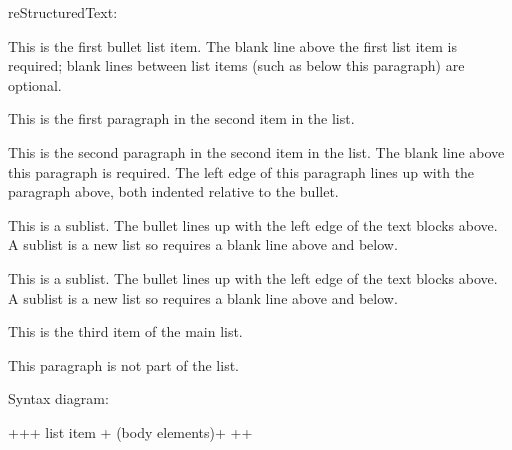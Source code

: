 \documentclass[letterpaper,12pt,english]{sphinxmanual}
\begin{document}
reStructuredText:

\begin{sphinxVerbatim}[commandchars=\\\{\}]
 This is the first bullet list item.  The blank line above the
  first list item is required; blank lines between list items
  (such as below this paragraph) are optional.

 This is the first paragraph in the second item in the list.

  This is the second paragraph in the second item in the list.
  The blank line above this paragraph is required.  The left edge
  of this paragraph lines up with the paragraph above, both
  indented relative to the bullet.

   This is a sublist.  The bullet lines up with the left edge of
    the text blocks above.  A sublist is a new list so requires a
    blank line above and below.

   This is a sublist.  The bullet lines up with the left edge of
the text blocks above.  A sublist is a new list so requires a
blank line above and below.

 This is the third item of the main list.

This paragraph is not part of the list.
\end{sphinxVerbatim}

Syntax diagram:

\begin{sphinxVerbatim}[commandchars=\\\{\}]
+\PYGZhy{}\PYGZhy{}\PYGZhy{}\PYGZhy{}\PYGZhy{}\PYGZhy{}+\PYGZhy{}\PYGZhy{}\PYGZhy{}\PYGZhy{}\PYGZhy{}\PYGZhy{}\PYGZhy{}\PYGZhy{}\PYGZhy{}\PYGZhy{}\PYGZhy{}\PYGZhy{}\PYGZhy{}\PYGZhy{}\PYGZhy{}\PYGZhy{}\PYGZhy{}\PYGZhy{}\PYGZhy{}\PYGZhy{}\PYGZhy{}\PYGZhy{}\PYGZhy{}+
 \PYGZdq{}\PYGZhy{} \PYGZdq{} \textbar{} list item             \textbar{}
+\PYGZhy{}\PYGZhy{}\PYGZhy{}\PYGZhy{}\PYGZhy{}\PYGZhy{}\textbar{} (body elements)+      \textbar{}
       +\PYGZhy{}\PYGZhy{}\PYGZhy{}\PYGZhy{}\PYGZhy{}\PYGZhy{}\PYGZhy{}\PYGZhy{}\PYGZhy{}\PYGZhy{}\PYGZhy{}\PYGZhy{}\PYGZhy{}\PYGZhy{}\PYGZhy{}\PYGZhy{}\PYGZhy{}\PYGZhy{}\PYGZhy{}\PYGZhy{}\PYGZhy{}\PYGZhy{}\PYGZhy{}+
\end{sphinxVerbatim}
\end{document}
